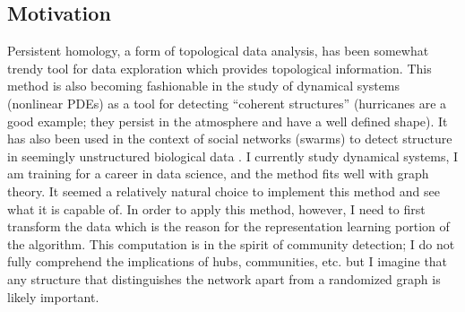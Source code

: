 \documentclass[letter,10pt,openany]{article}
\begin{document}
\subsection{Motivation}
Persistent homology, a form of topological data analysis,
has been somewhat trendy tool for data exploration which provides topological
information. This method is also becoming fashionable in the study of dynamical
systems (nonlinear PDEs) as a tool for detecting ``coherent structures''
\cite{ComplexNetworks}
(hurricanes are a good example; they persist in the atmosphere and have a well defined
shape). It has also been used in the context of social networks (swarms) to
detect structure in seemingly unstructured biological data \cite{Topaz}.
I currently study dynamical systems, I am training for a career in data
science, and the method fits well with graph theory.
It seemed a relatively natural choice to implement this method and
see what it is capable of. In order to apply this method, however, I need to first
transform the data which is the reason for the representation learning portion of the
algorithm. This computation is in the spirit of community detection; I
do not fully comprehend the implications of hubs, communities, etc. but I imagine
that any structure that distinguishes the network apart from a randomized
graph is likely important.
\end{document}
